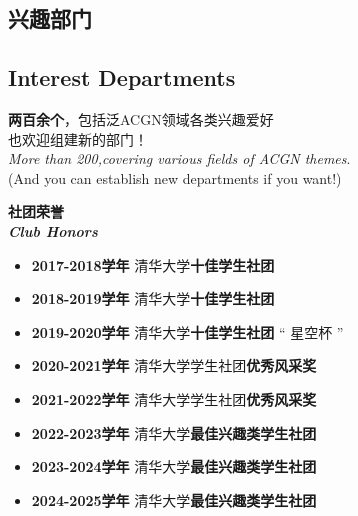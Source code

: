 \documentclass[twoside,12pt]{book}
\begin{document}
\begin{flushleft}
\begin{minipage}[t]{0.5\textwidth}
        \section*{\normalsize\textbf{\textcolor{truepurple}{兴趣部门}}}
        \vspace{-1em}
        \subsection*{\normalsize\textbf{\textcolor{thuorange}{Interest Departments}}}
        \vspace{-0.5em}
        \small
        \textbf{两百余个}，包括泛ACGN领域各类兴趣爱好\\也欢迎组建新的部门！\\ \textit{More than 200,covering various fields of ACGN themes}. \\(And you can establish new departments if you want!)
    \end{minipage}
\end{flushleft}

\vfill

\vspace{0.5cm}
\begin{center}
    \Large\textbf{\textcolor{truepurple}{社团荣誉}}
    \\[0ex]
    \large\textbf{\textit{\textcolor{thuorange}{Club Honors}}}
\end{center}

\vspace{0.5cm}
\begin{flushleft}
    \begin{itemize}
        \item[] \normalsize\textbf{2017-2018学年} \qquad 清华大学\textbf{十佳学生社团}
        \item[] \normalsize\textbf{2018-2019学年} \qquad 清华大学\textbf{十佳学生社团}
        \item[] \normalsize\textbf{2019-2020学年} \qquad 清华大学\textbf{十佳学生社团} “ 星空杯 ”
        \item[] \normalsize\textbf{2020-2021学年} \qquad 清华大学学生社团\textbf{优秀风采奖}
        \item[] \normalsize\textbf{2021-2022学年} \qquad 清华大学学生社团\textbf{优秀风采奖}
        \item[] \normalsize\textbf{2022-2023学年} \qquad 清华大学\textbf{最佳兴趣类学生社团}
        \item[] \normalsize\textbf{2023-2024学年} \qquad 清华大学\textbf{最佳兴趣类学生社团}
        \item[] \normalsize\textbf{2024-2025学年} \qquad 清华大学\textbf{最佳兴趣类学生社团}
    \end{itemize}
\end{flushleft}
\end{document}
